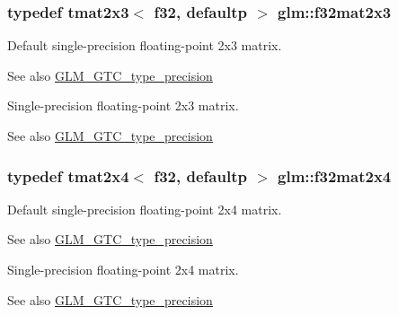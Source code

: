 \subsubsection[{f32mat2x3}]{\setlength{\rightskip}{0pt plus 5cm}typedef tmat2x3$<$ f32, defaultp $>$ {\bf glm\+::f32mat2x3}}\label{group__gtc__type__precision_gac4573d3d213b2bce23943caef565a211}
Default single-\/precision floating-\/point 2x3 matrix. \begin{DoxySeeAlso}{See also}
\hyperlink{group__gtc__type__precision}{G\+L\+M\+\_\+\+G\+T\+C\+\_\+type\+\_\+precision}
\end{DoxySeeAlso}
Single-\/precision floating-\/point 2x3 matrix. \begin{DoxySeeAlso}{See also}
\hyperlink{group__gtc__type__precision}{G\+L\+M\+\_\+\+G\+T\+C\+\_\+type\+\_\+precision} 
\end{DoxySeeAlso}
\hypertarget{group__gtc__type__precision_gab0eab14575c18077fd3415539bce685a}{}
\subsubsection[{f32mat2x4}]{\setlength{\rightskip}{0pt plus 5cm}typedef tmat2x4$<$ f32, defaultp $>$ {\bf glm\+::f32mat2x4}}\label{group__gtc__type__precision_gab0eab14575c18077fd3415539bce685a}
Default single-\/precision floating-\/point 2x4 matrix. \begin{DoxySeeAlso}{See also}
\hyperlink{group__gtc__type__precision}{G\+L\+M\+\_\+\+G\+T\+C\+\_\+type\+\_\+precision}
\end{DoxySeeAlso}
Single-\/precision floating-\/point 2x4 matrix. \begin{DoxySeeAlso}{See also}
\hyperlink{group__gtc__type__precision}{G\+L\+M\+\_\+\+G\+T\+C\+\_\+type\+\_\+precision} 
\end{DoxySeeAlso}
\hypertarget{group__gtc__type__precision_ga5fbaec59b220964f59403bb362b5f93e}{}
